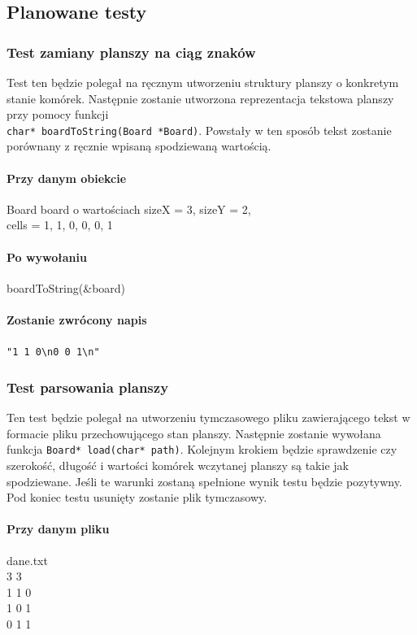 \documentclass{mwart}
\begin{document}
\subsection{Planowane testy}

\subsubsection{Test zamiany planszy na ciąg znaków} 
Test ten będzie polegał na ręcznym utworzeniu struktury planszy o konkretym stanie komórek. Następnie zostanie utworzona reprezentacja tekstowa planszy przy pomocy funkcji \\ \texttt{char* boardToString(Board *Board)}. Powstały w ten sposób tekst zostanie porównany z ręcznie wpisaną spodziewaną wartością.

\paragraph{Przy danym obiekcie} Board board o wartościach sizeX = 3, sizeY = 2, \\ cells = {1, 1, 0, 0, 0, 1 }
\paragraph{Po wywołaniu} boardToString(\&board)
\paragraph{Zostanie zwrócony napis} \texttt{"1 1 0\textbackslash{}n0 0 1\textbackslash{}n"}


\subsubsection{Test parsowania planszy}
Ten test będzie polegał na utworzeniu tymczasowego pliku zawierającego tekst w formacie pliku przechowującego stan planszy. Następnie zostanie wywołana funkcja \texttt{Board* load(char* path)}. Kolejnym krokiem będzie sprawdzenie czy szerokość, długość i wartości komórek wczytanej planszy są takie jak spodziewane. Jeśli te warunki zostaną spełnione wynik testu będzie pozytywny. Pod koniec testu usunięty zostanie plik tymczasowy.

\paragraph{Przy danym pliku} dane.txt \\
3 3\\
1 1 0\\
1 0 1\\
0 1 1\\
\end{document}
